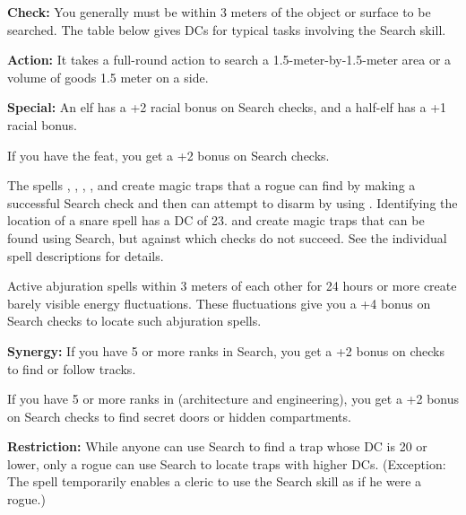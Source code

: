 \textbf{Check:} You generally must be within 3 meters of the object or surface to be searched. The table below gives DCs for typical tasks involving the Search skill.

\textbf{Action:} It takes a full-round action to search a 1.5-meter-by-1.5-meter area or a volume of goods 1.5 meter on a side.

\textbf{Special:} An elf has a +2 racial bonus on Search checks, and a half-elf has a +1 racial bonus.

If you have the  feat, you get a +2 bonus on Search checks.

The spells , , , , and  create magic traps that a rogue can find by making a successful Search check and then can attempt to disarm by using . Identifying the location of a snare spell has a DC of 23.  and  create magic traps that can be found using Search, but against which  checks do not succeed. See the individual spell descriptions for details.

Active abjuration spells within 3 meters of each other for 24 hours or more create barely visible energy fluctuations. These fluctuations give you a +4 bonus on Search checks to locate such abjuration spells.

\textbf{Synergy:} If you have 5 or more ranks in Search, you get a +2 bonus on  checks to find or follow tracks.

If you have 5 or more ranks in  (architecture and engineering), you get a +2 bonus on Search checks to find secret doors or hidden compartments.

\textbf{Restriction:} While anyone can use Search to find a trap whose DC is 20 or lower, only a rogue can use Search to locate traps with higher DCs. (Exception: The spell  temporarily enables a cleric to use the Search skill as if he were a rogue.)